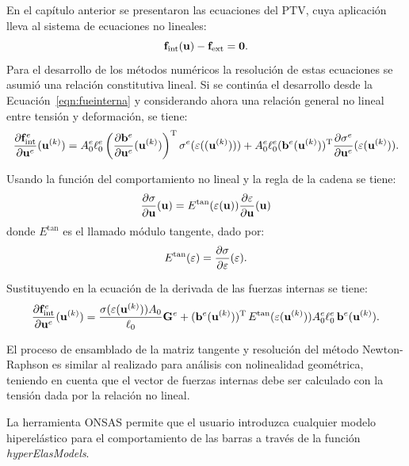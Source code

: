 En el capítulo anterior se presentaron las ecuaciones del PTV, cuya aplicación lleva al sistema de ecuaciones no lineales:
%
\begin{equation}
  {\bf f}_{\text{int}}({\bf u}) - {\bf f}_{\text{ext}} = \boldsymbol{0}.
\end{equation}
%
Para el desarrollo de los métodos numéricos la resolución de estas ecuaciones se asumió una relación constitutiva lineal. %
%
Si se continúa el desarrollo desde la Ecuación~\eqref{eqn:fueinterna} y considerando ahora una relación general no lineal entre tensión y deformación, se tiene:
%
\begin{equation}
\frac{\partial {\bf f}^e_{\text{int}} } {\partial {\bf u}^e} ({\bf u}^{(k)}) 
= A_0^e \ell_0^e \left( \frac{\partial {\bf b}^e}{\partial {\bf u}^e} ({\bf u}^{(k)}) \right)^{\text{T}} \sigma^e(\varepsilon(({\bf u}^{(k)})))
+ A_0^e \ell_0^e  ({\bf b}^e({\bf u}^{(k)}))^{\text{T}} \frac{ \partial \sigma^e}{\partial {\bf u}^e}( \varepsilon( {\bf u}^{(k)}) ).
\end{equation}

Usando la función del comportamiento no lineal y la regla de la cadena se tiene:
\begin{equation}
\frac{ \partial \sigma}{\partial {\bf u}}({\bf u}) = E^{\text{tan}}(\varepsilon({\bf u})) \frac{ \partial \varepsilon}{\partial {\bf u}}({\bf u})
\end{equation}
donde $E^{\text{tan}}$ es el llamado módulo tangente, dado por:
\begin{equation}
E^{\text{tan}}(\varepsilon) = \frac{ \partial \sigma}{\partial \varepsilon} (\varepsilon).
\end{equation}

Sustituyendo en la ecuación de la derivada de las fuerzas internas se tiene:
\begin{equation}
\frac{\partial {\bf f}_{\text{int}}^e } {\partial {\bf u}^e} ({\bf u}^{(k)})
= \frac{\sigma ( \varepsilon( {\bf u}^{(k)}) ) A_0 }{\ell_0} {\bf G}^e
+  ({\bf b}^e({\bf u}^{(k)}))^{\text{T}} \,  E^{\text{tan}} (\varepsilon({\bf u}^{(k)})) A_0^e \ell_0^e \, {\bf b}^e({\bf u}^{(k)}).
\end{equation}

El proceso de ensamblado de la matriz tangente y resolución del método Newton-Raphson es similar al realizado para análisis con nolinealidad geométrica, teniendo en cuenta que el vector de fuerzas internas debe ser calculado con la tensión dada por la relación no lineal.


La herramienta ONSAS permite que el usuario introduzca cualquier modelo hiperelástico para el comportamiento de las barras a través de la función \textit{hyperElasModels}.


